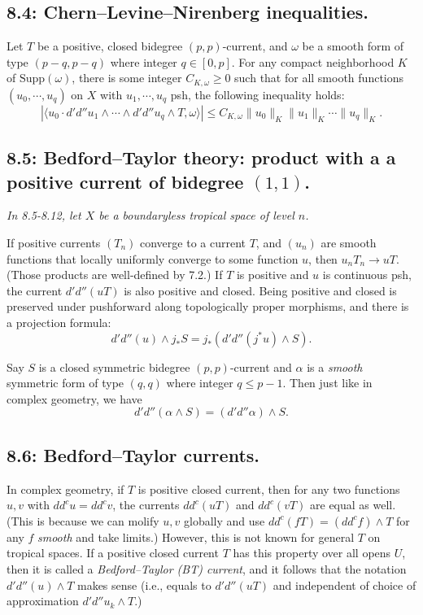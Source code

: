 \documentclass[12pt,reqno]{amsart}
\theoremstyle{definition}
\theoremstyle{remark}
\theoremstyle{citedrem}
\theoremstyle{cited}
\theoremstyle{citeddef}
\theoremstyle{step}
\begin{document}
\subsection*{8.4: Chern--Levine--Nirenberg inequalities. }Let $T$ be a positive, closed bidegree $(p,p)$-current, and $\omega$ be a smooth form of type $(p-q,p-q)$ where integer $q \in [0,p]$. For any compact neighborhood $K$ of $\mathrm{Supp}(\omega)$, there is some integer $C_{K, \omega} \geq 0$ such that for all smooth functions $(u_0, \cdots, u_q)$ on $X$ with $u_1, \cdots, u_q$ psh, the following inequality holds:
\[|\langle u_0 \cdot d'd''u_1 \wedge \cdots \wedge d'd''u_q \wedge T, \omega\rangle| \leq C_{K, \omega} \|u_0\|_K \|u_1\|_K \cdots \|u_q\|_K.\]

\subsection*{8.5: Bedford--Taylor theory: product with a a positive current of bidegree $(1,1)$. }\begin{center}\emph{In 8.5-8.12, let $X$ be a boundaryless tropical space of level $n$.}\end{center}
If positive currents $(T_n)$ converge to a current $T$, and $(u_n)$ are smooth functions that locally uniformly converge to some function $u$, then $u_nT_n \to uT$. (Those products are well-defined by 7.2.) If $T$ is positive and $u$ is continuous psh, the current $d'd''(uT)$ is also positive and closed. Being positive and closed is preserved under pushforward along topologically proper morphisms, and there is a projection formula: 
\[d'd''(u) \wedge j_* S = j_*(d'd''(j^*u) \wedge S).\]

Say $S$ is a closed symmetric bidegree $(p,p)$-current and $\alpha$ is a \emph{smooth} symmetric form of type $(q,q)$ where integer $q \leq p - 1$. Then just like in complex geometry, we have \[d'd''(\alpha \wedge S) = (d'd'' \alpha) \wedge S.\]

\subsection*{8.6: Bedford--Taylor currents. }In complex geometry, if $T$ is positive closed current, then for any two functions $u,v$ with $dd^cu = dd^cv$, the currents $dd^c(uT)$ and $dd^c(vT)$ are equal as well. (This is because we can molify $u,v$ globally and use $dd^c(fT) = (dd^cf)\wedge T$ for any $f$ \emph{smooth} and take limits.) However, this is not known for general $T$ on tropical spaces. If a positive closed current $T$ has this property over all opens $U$, then it is called a \emph{Bedford--Taylor (BT) current}, and it follows that the notation $d'd''(u) \wedge T$ makes sense (i.e., equals to $d'd''(u T)$ and independent of choice of approximation $d'd''u_k \wedge T$.)
\end{document}
